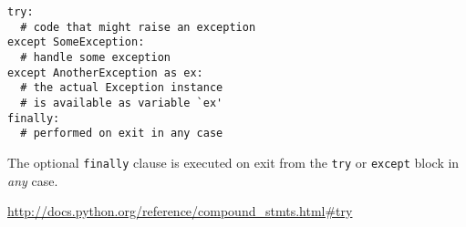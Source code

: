 \documentclass[english,serif,mathserif,xcolor=pdftex,dvipsnames,table]{beamer}
\begin{document}
\begin{frame}[fragile]
\begin{lstlisting}
try:
  # code that might raise an exception
except SomeException:
  # handle some exception
except AnotherException as ex:
  # the actual Exception instance
  # is available as variable `ex'
finally:
  # performed on exit in any case
\end{lstlisting}

  \+
  The optional \lstinline|finally| clause is executed on exit from the
  \lstinline|try| or \lstinline|except| block in \emph{any} case.

  \begin{references}
    \scriptsize
    \url{http://docs.python.org/reference/compound_stmts.html#try}
\end{references}
\end{frame}
\end{document}
